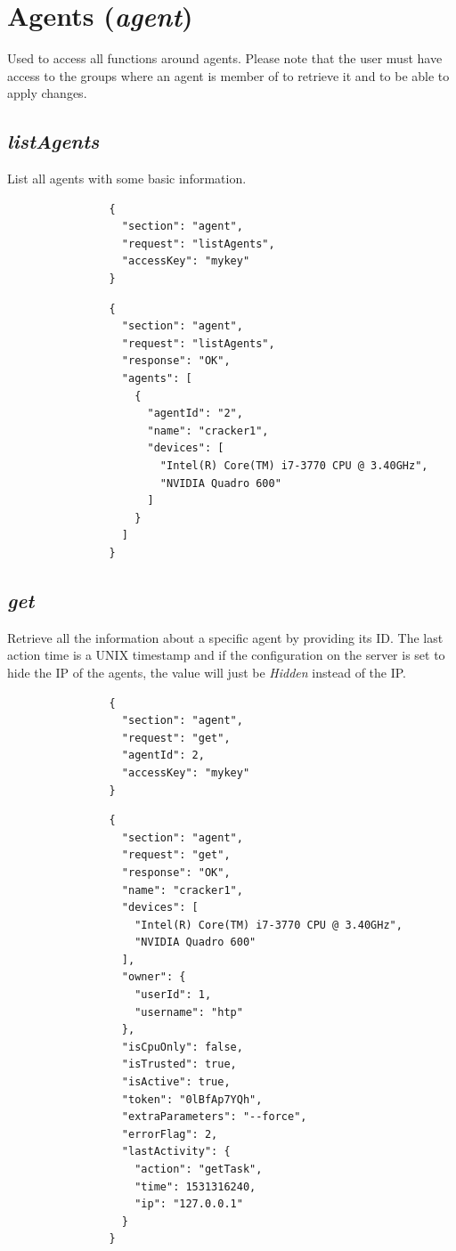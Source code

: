 	\section*{Agents (\textit{agent})}
		Used to access all functions around agents. Please note that the user must have access to the groups where an agent is member of to retrieve it and to be able to apply changes.
		\subsection*{\textit{listAgents}}
			List all agents with some basic information.
			{
				\color{blue}
				\begin{verbatim}
				{
				  "section": "agent",
				  "request": "listAgents",
				  "accessKey": "mykey"
				}
				\end{verbatim}
			}
			{
				\color{OliveGreen}
				\begin{verbatim}
				{
				  "section": "agent",
				  "request": "listAgents",
				  "response": "OK",
				  "agents": [
				    {
				      "agentId": "2",
				      "name": "cracker1",
				      "devices": [
				        "Intel(R) Core(TM) i7-3770 CPU @ 3.40GHz",
				        "NVIDIA Quadro 600"
				      ]
				    }
				  ]
				}
				\end{verbatim}
			}
		\subsection*{\textit{get}}
			Retrieve all the information about a specific agent by providing its ID. The last action time is a UNIX timestamp and if the configuration on the server is set to hide the IP of the agents, the value will just be \textit{Hidden} instead of the IP.
			{
				\color{blue}
				\begin{verbatim}
				{
				  "section": "agent",
				  "request": "get",
				  "agentId": 2,
				  "accessKey": "mykey"
				}
				\end{verbatim}
			}
			{
				\color{OliveGreen}
				\begin{verbatim}
				{
				  "section": "agent",
				  "request": "get",
				  "response": "OK",
				  "name": "cracker1",
				  "devices": [
				    "Intel(R) Core(TM) i7-3770 CPU @ 3.40GHz",
				    "NVIDIA Quadro 600"
				  ],
				  "owner": {
				    "userId": 1,
				    "username": "htp"
				  },
				  "isCpuOnly": false,
				  "isTrusted": true,
				  "isActive": true,
				  "token": "0lBfAp7YQh",
				  "extraParameters": "--force",
				  "errorFlag": 2,
				  "lastActivity": {
				    "action": "getTask",
				    "time": 1531316240,
				    "ip": "127.0.0.1"
				  }
				}
				\end{verbatim}
			}
